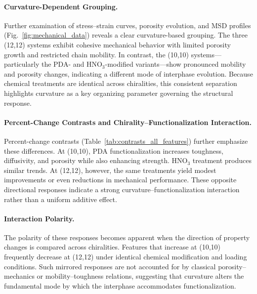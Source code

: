\documentclass[journal=jacsat,manuscript=article]{achemso}
\begin{document}
{\paragraph{Curvature-Dependent Grouping.}
Further examination of stress–strain curves, porosity evolution, and MSD profiles (Fig.~\ref{fig:mechanical_data}) reveals a clear curvature-based grouping. The three (12,12) systems exhibit cohesive mechanical behavior with limited porosity growth and restricted chain mobility. In contrast, the (10,10) systems—particularly the PDA- and HNO$_3$-modified variants—show pronounced mobility and porosity changes, indicating a different mode of interphase evolution. Because chemical treatments are identical across chiralities, this consistent separation highlights curvature as a key organizing parameter governing the structural response.

\paragraph{Percent-Change Contrasts and Chirality–Functionalization Interaction.}
Percent-change contrasts (Table~\ref{tab:contrasts_all_features}) further emphasize these differences. At (10,10), PDA functionalization increases toughness, diffusivity, and porosity while also enhancing strength. HNO$_3$ treatment produces similar trends. At (12,12), however, the same treatments yield modest improvements or even reductions in mechanical performance. These opposite directional responses indicate a strong curvature–functionalization interaction rather than a uniform additive effect.

\paragraph{Interaction Polarity.}
The polarity of these responses becomes apparent when the direction of property changes is compared across chiralities. Features that increase at (10,10) frequently decrease at (12,12) under identical chemical modification and loading conditions. Such mirrored responses are not accounted for by classical porosity–mechanics or mobility–toughness relations, suggesting that curvature alters the fundamental mode by which the interphase accommodates functionalization.

}
\end{document}
